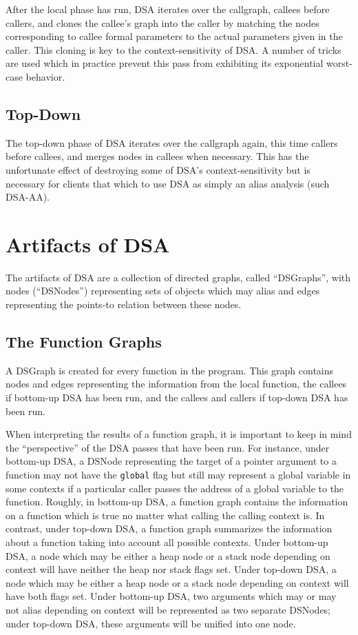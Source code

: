 \documentclass{article}
\begin{document}
After the local phase has run, DSA iterates over the callgraph,
callees before callers, and clones the callee's graph into the caller
by matching the nodes corresponding to callee formal parameters to the
actual parameters given in the caller.  This cloning is key to the
context-sensitivity of DSA.  A number of tricks are used which in
practice prevent this pass from exhibiting its exponential worst-case
behavior.

\subsection{Top-Down}

The top-down phase of DSA iterates over the callgraph again, this time
callers before callees, and merges nodes in callees when necessary.
This has the unfortunate effect of destroying some of DSA's
context-sensitivity but is necessary for clients that which to use DSA
as simply an alias analysis (such DSA-AA).

\section{Artifacts of DSA}

The artifacts of DSA are a collection of directed graphs, called
``DSGraphs'', with nodes (``DSNodes'') representing sets of objects
which may alias and edges representing the points-to relation between
these nodes.

\subsection{The Function Graphs}
\label{fungraph}

A DSGraph is created for every function in the program.  This graph
contains nodes and edges representing the information from the local
function, the callees if bottom-up DSA has been run, and the callees
and callers if top-down DSA has been run.

When interpreting the results of a function graph, it is important to
keep in mind the ``perspective'' of the DSA passes that have been run.
For instance, under bottom-up DSA, a DSNode representing the target of
a pointer argument to a function may not have the \texttt{global} flag
but still may represent a global variable in some contexts if a
particular caller passes the address of a global variable to the
function.  Roughly, in bottom-up DSA, a function graph contains the
information on a function which is true no matter what calling the
calling context is.  In contrast, under top-down DSA, a function graph
summarizes the information about a function taking into account all
possible contexts.  Under bottom-up DSA, a node which may be either a
heap node or a stack node depending on context will have neither the
heap nor stack flags set.  Under top-down DSA, a node which may be
either a heap node or a stack node depending on context will have both
flags set.  Under bottom-up DSA, two arguments which may or may not
alias depending on context will be represented as two separate
DSNodes; under top-down DSA, these arguments will be unified into one
node.
\end{document}

